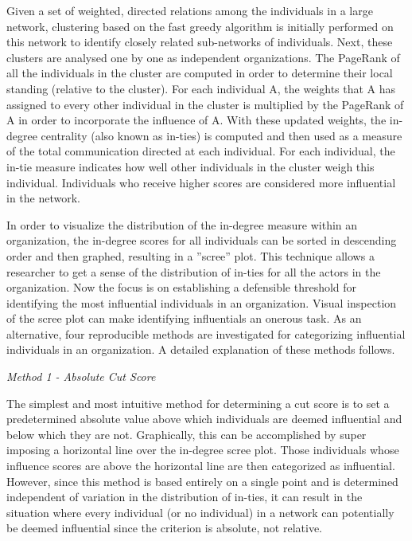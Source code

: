 Given a set of weighted, directed relations among the individuals in a large network, clustering based on the fast greedy algorithm  is initially performed on this network to identify closely related sub-networks of individuals. Next, these clusters are analysed one by one as independent organizations. The PageRank  of all the individuals in the cluster are computed in order to determine their local standing (relative to the cluster). For each individual A, the weights that A has assigned to every other individual in the cluster is multiplied by the PageRank of A in order to incorporate the influence of A. With these updated weights, the in-degree centrality (also known as in-ties) is computed and then used as a measure of the total communication directed at each individual. For each individual, the in-tie measure indicates how well other individuals in the cluster weigh this individual. Individuals who receive higher scores are considered more influential in the network.

In order to visualize the distribution of the in-degree measure within an organization, the in-degree scores for all individuals can be sorted in descending order and then graphed, resulting in a ”scree” plot. This technique allows a researcher to get a sense of the distribution of in-ties for all the actors in the organization. Now the focus is on establishing a defensible threshold for identifying the most influential individuals in an organization. Visual inspection of the scree plot can make identifying influentials an onerous task. As an alternative, four reproducible methods are investigated for categorizing influential individuals in an organization. A detailed explanation of these methods follows. 

{\em Method 1 - Absolute Cut Score}

The simplest and most intuitive method for determining a cut score is to set a predetermined absolute value above which individuals are deemed influential and below which they are not. Graphically, this can be accomplished by super imposing a horizontal line over the in-degree scree plot. Those individuals whose influence scores are above the horizontal line are then categorized as influential. However, since this method is based entirely on a single point and is determined independent of variation in the distribution of in-ties, it can result in the situation where every individual (or no individual) in a network can potentially be deemed influential since the criterion is absolute, not relative.

